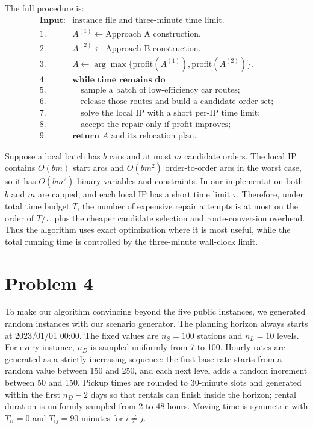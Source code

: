 \documentclass[10pt,a4paper]{article}
\begin{document}
The full procedure is:
\[
\begin{array}{ll}
\textbf{Input:} & \text{instance file and three-minute time limit}.\\
1. & A^{(1)}\leftarrow\text{Approach A construction}.\\
2. & A^{(2)}\leftarrow\text{Approach B construction}.\\
3. & A\leftarrow\arg\max\{\text{profit}(A^{(1)}),\text{profit}(A^{(2)})\}.\\
4. & \textbf{while time remains do}\\
5. & \quad \text{sample a batch of low-efficiency car routes};\\
6. & \quad \text{release those routes and build a candidate order set};\\
7. & \quad \text{solve the local IP with a short per-IP time limit};\\
8. & \quad \text{accept the repair only if profit improves};\\
9. & \textbf{return } A \text{ and its relocation plan.}
\end{array}
\]

Suppose a local batch has $b$ cars and at most $m$ candidate orders.  The local
IP contains $O(bm)$ start arcs and $O(bm^2)$ order-to-order arcs in the worst
case, so it has $O(bm^2)$ binary variables and constraints.  In our
implementation both $b$ and $m$ are capped, and each local IP has a short time
limit $\tau$.  Therefore, under total time budget $T$, the number of expensive
repair attempts is at most on the order of $T/\tau$, plus the cheaper candidate
selection and route-conversion overhead.  Thus the algorithm uses exact
optimization where it is most useful, while the total running time is controlled
by the three-minute wall-clock limit.

\section*{Problem 4}

To make our algorithm convincing beyond the five public instances, we generated
random instances with our scenario generator.  The planning horizon
always starts at 2023/01/01 00:00.  The fixed values are $n_S=100$ stations and
$n_L=10$ levels.  For every instance, $n_D$ is sampled uniformly from 7 to 100.
Hourly rates are generated as a strictly increasing sequence: the first base
rate starts from a random value between 150 and 250, and each next level adds a
random increment between 50 and 150.  Pickup times are rounded to 30-minute
slots and generated within the first $n_D-2$ days so that rentals can finish
inside the horizon; rental duration is uniformly sampled from 2 to 48 hours.
Moving time is symmetric with $T_{ii}=0$ and $T_{ij}=90$ minutes for $i\ne j$.
\end{document}
